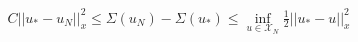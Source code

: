 \begin{align}
	\boxed{C || u_* - u_N||^2_x \leq \Sigma(u_N) - \Sigma(u_*) \leq \inf_{u \in \mathcal X_N} \frac{1}{2} || u_* - u ||^2_x}
\end{align}













































